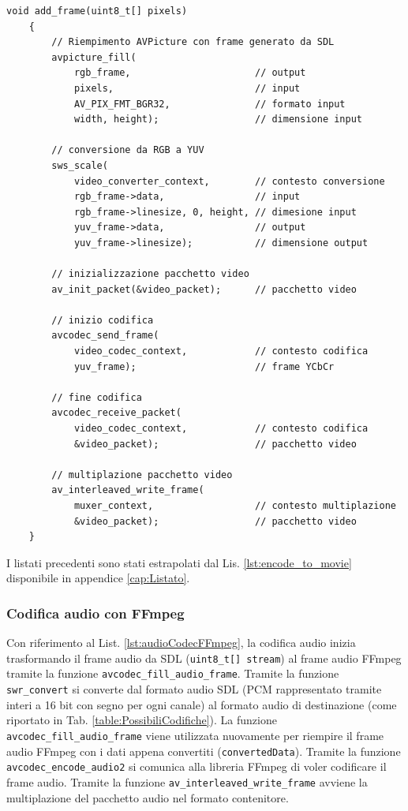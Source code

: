\begin{lstlisting}[caption=Codice per la codifica video, label={lst:videoCodecFFmpeg}]
	void add_frame(uint8_t[] pixels)
	{
		// Riempimento AVPicture con frame generato da SDL
		avpicture_fill(
			rgb_frame, 						// output
			pixels, 						// input
			AV_PIX_FMT_BGR32,				// formato input
			width, height); 				// dimensione input

		// conversione da RGB a YUV
		sws_scale(
			video_converter_context,		// contesto conversione
			rgb_frame->data,				// input
			rgb_frame->linesize, 0, height,	// dimesione input
			yuv_frame->data, 				// output
			yuv_frame->linesize); 			// dimensione output

		// inizializzazione pacchetto video
		av_init_packet(&video_packet);		// pacchetto video

		// inizio codifica
		avcodec_send_frame(
			video_codec_context,			// contesto codifica
			yuv_frame);						// frame YCbCr

		// fine codifica
		avcodec_receive_packet(
			video_codec_context,			// contesto codifica
			&video_packet);					// pacchetto video

		// multiplazione pacchetto video
		av_interleaved_write_frame(
			muxer_context,					// contesto multiplazione
			&video_packet);					// pacchetto video
	}
\end{lstlisting}

I listati precedenti sono stati estrapolati dal Lis. \ref{lst:encode_to_movie} disponibile in appendice \ref{cap:Listato}.



\subsubsection{Codifica audio con FFmpeg}
Con riferimento al List. \ref{lst:audioCodecFFmpeg}, la codifica audio inizia trasformando il frame audio da SDL (\verb|uint8_t[] stream|) al frame audio FFmpeg tramite la funzione \verb|avcodec_fill_audio_frame|. Tramite la funzione \verb|swr_convert| si converte dal formato audio SDL (PCM rappresentato tramite interi a 16 bit con segno per ogni canale) al formato audio di destinazione (come riportato in Tab. \ref{table:PossibiliCodifiche}). La funzione \verb|avcodec_fill_audio_frame| viene utilizzata nuovamente per riempire il frame audio FFmpeg con i dati appena convertiti (\verb|convertedData|). Tramite la funzione \verb|avcodec_encode_audio2| si comunica alla libreria FFmpeg di voler codificare il frame audio. Tramite la funzione \verb|av_interleaved_write_frame| avviene la multiplazione del pacchetto audio nel formato contenitore.

